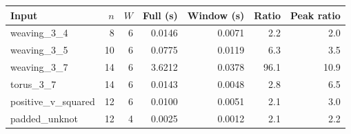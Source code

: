 \begin{tabular}{lrrrrrr}\toprule
Input & $n$ & $W$ & Full (s) & Window (s) & Ratio & Peak ratio\\\midrule
weaving\_3\_4 & 8 & 6 & 0.0146 & 0.0071 & 2.2 & 2.0\\
weaving\_3\_5 & 10 & 6 & 0.0775 & 0.0119 & 6.3 & 3.5\\
weaving\_3\_7 & 14 & 6 & 3.6212 & 0.0378 & 96.1 & 10.9\\
torus\_3\_7 & 14 & 6 & 0.0143 & 0.0048 & 2.8 & 6.5\\
positive\_v\_squared & 12 & 6 & 0.0100 & 0.0051 & 2.1 & 3.0\\
padded\_unknot & 12 & 4 & 0.0025 & 0.0012 & 2.1 & 2.2\\
\bottomrule\end{tabular}
